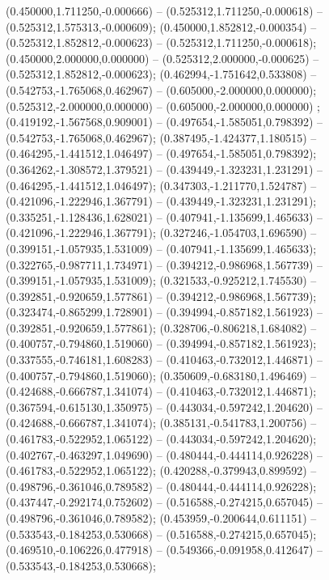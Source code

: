  (0.450000,1.711250,-0.000666) -- (0.525312,1.711250,-0.000618) -- (0.525312,1.575313,-0.000609);
 (0.450000,1.852812,-0.000354) -- (0.525312,1.852812,-0.000623) -- (0.525312,1.711250,-0.000618);
 (0.450000,2.000000,0.000000) -- (0.525312,2.000000,-0.000625) -- (0.525312,1.852812,-0.000623);
 (0.462994,-1.751642,0.533808) -- (0.542753,-1.765068,0.462967) -- (0.605000,-2.000000,0.000000);
 (0.525312,-2.000000,0.000000) -- (0.605000,-2.000000,0.000000) ;
 (0.419192,-1.567568,0.909001) -- (0.497654,-1.585051,0.798392) -- (0.542753,-1.765068,0.462967);
 (0.387495,-1.424377,1.180515) -- (0.464295,-1.441512,1.046497) -- (0.497654,-1.585051,0.798392);
 (0.364262,-1.308572,1.379521) -- (0.439449,-1.323231,1.231291) -- (0.464295,-1.441512,1.046497);
 (0.347303,-1.211770,1.524787) -- (0.421096,-1.222946,1.367791) -- (0.439449,-1.323231,1.231291);
 (0.335251,-1.128436,1.628021) -- (0.407941,-1.135699,1.465633) -- (0.421096,-1.222946,1.367791);
 (0.327246,-1.054703,1.696590) -- (0.399151,-1.057935,1.531009) -- (0.407941,-1.135699,1.465633);
 (0.322765,-0.987711,1.734971) -- (0.394212,-0.986968,1.567739) -- (0.399151,-1.057935,1.531009);
 (0.321533,-0.925212,1.745530) -- (0.392851,-0.920659,1.577861) -- (0.394212,-0.986968,1.567739);
 (0.323474,-0.865299,1.728901) -- (0.394994,-0.857182,1.561923) -- (0.392851,-0.920659,1.577861);
 (0.328706,-0.806218,1.684082) -- (0.400757,-0.794860,1.519060) -- (0.394994,-0.857182,1.561923);
 (0.337555,-0.746181,1.608283) -- (0.410463,-0.732012,1.446871) -- (0.400757,-0.794860,1.519060);
 (0.350609,-0.683180,1.496469) -- (0.424688,-0.666787,1.341074) -- (0.410463,-0.732012,1.446871);
 (0.367594,-0.615130,1.350975) -- (0.443034,-0.597242,1.204620) -- (0.424688,-0.666787,1.341074);
 (0.385131,-0.541783,1.200756) -- (0.461783,-0.522952,1.065122) -- (0.443034,-0.597242,1.204620);
 (0.402767,-0.463297,1.049690) -- (0.480444,-0.444114,0.926228) -- (0.461783,-0.522952,1.065122);
 (0.420288,-0.379943,0.899592) -- (0.498796,-0.361046,0.789582) -- (0.480444,-0.444114,0.926228);
 (0.437447,-0.292174,0.752602) -- (0.516588,-0.274215,0.657045) -- (0.498796,-0.361046,0.789582);
 (0.453959,-0.200644,0.611151) -- (0.533543,-0.184253,0.530668) -- (0.516588,-0.274215,0.657045);
 (0.469510,-0.106226,0.477918) -- (0.549366,-0.091958,0.412647) -- (0.533543,-0.184253,0.530668);
